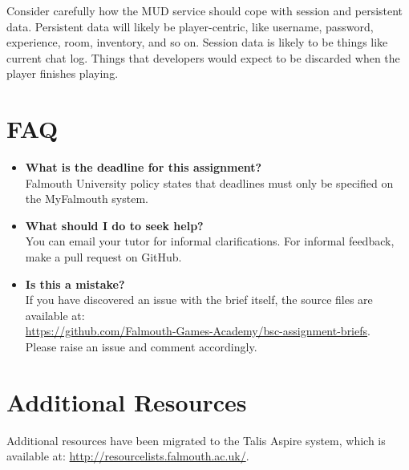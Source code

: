 \documentclass{../../fal_assignment}
\begin{document}
Consider carefully how the MUD service should cope with session and persistent data. Persistent data will likely be player-centric, like username, password, experience, room, inventory, and so on. Session data is likely to be things like current chat log. Things that developers would expect to be discarded when the player finishes playing.

\section*{FAQ}

\begin{itemize}
	\item 	\textbf{What is the deadline for this assignment?} \\ 
    		Falmouth University policy states that deadlines must only be specified on the MyFalmouth system.
    		
	\item 	\textbf{What should I do to seek help?} \\ 
    		You can email your tutor for informal clarifications. For informal feedback, make a pull request on GitHub. 
    		
    	\item 	\textbf{Is this a mistake?} \\ 	
    		If you have discovered an issue with the brief itself, the source files are available at: \\
    		\url{https://github.com/Falmouth-Games-Academy/bsc-assignment-briefs}.\\
    		 Please raise an issue and comment accordingly.
\end{itemize}

\section*{Additional Resources}

Additional resources have been migrated to the Talis Aspire system, which is available at: \url{http://resourcelists.falmouth.ac.uk/}.

\rubricyeartwo
\end{document}
